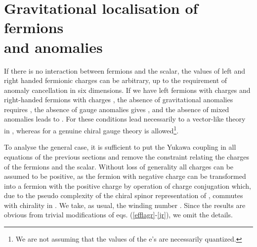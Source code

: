 \documentclass[a4paper,12pt]{article}
\begin{document}
\section{Gravitational localisation of fermions\\ and anomalies}
If there is no interaction between fermions and the scalar,  the
values of \coordHE{} left and right handed  fermionic charges can be
arbitrary, up to the requirement of anomaly cancellation in six
dimensions. If we have \coordHE{} left fermions with charges \coordHE{} and
\coordHE{} right-handed fermions with charges \coordHE{}, the absence of
gravitational anomalies requires \coordHE{}, the absence
of gauge anomalies gives \coordHE{}, and the
absence of mixed anomalies leads to \coordHE{}
\cite{Alvarez-Gaume:1983ig}. For \coordHE{} these conditions lead
necessarily to a vector-like theory in \coordHE{}, whereas for \coordHE{}
a genuine chiral gauge theory is allowed\footnote{We are not assuming
that the values of the e's are necessarily quantized.}.

To analyse the general case, it is sufficient to put the Yukawa
coupling  \coordHE{} in all equations of the previous sections and remove
the  constraint relating the charges of the fermions and  the scalar.
Without loss of generality all charges can be assumed to be positive,
as the fermion with negative charge can be transformed into a fermion
with the positive charge by operation of charge conjugation which,
due to the pseudo complexity of the chiral spinor representation of
\coordHE{}, commutes with chirality in \coordHE{}. We take, as usual, the
winding number \coordHE{}.  Since the results are obvious from trivial
modifications of  eqs. (\ref{efflagr}-\ref{jr}), we omit the
details. 
\end{document}
